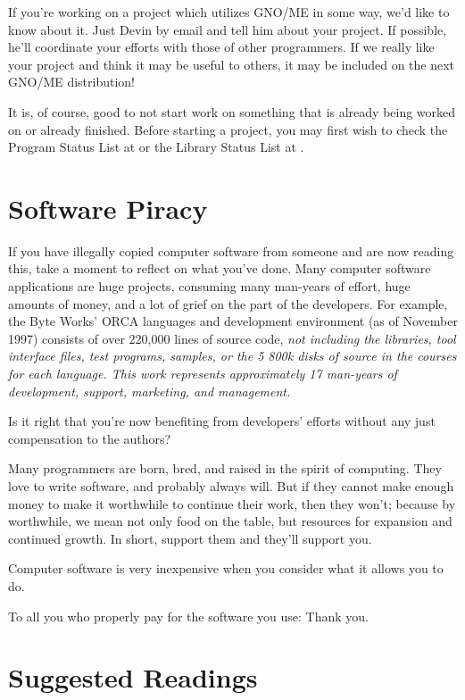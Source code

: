 \documentclass{report}
\begin{document}
If you're working on a project which
utilizes GNO/ME in some way, we'd like to know about it. Just
Devin by email and tell him about your project. If possible, he'll
coordinate your efforts with those of other programmers. If we
really like your project and think it may be useful to others, it
may be included on the next GNO/ME distribution!

It is, of course, good to not start work on something that is already
being worked on or already finished.  Before starting a project, you may
first wish to check the Program Status List at
or the Library Status List at
.

\section{Software Piracy}

If you have illegally copied computer software from someone
and are now reading this, take a moment to reflect on what you've done.
Many computer software applications are huge projects, consuming
many man-years of effort, huge amounts of money, and a lot of grief on the
part of the developers.
For example, the Byte Works' ORCA languages and development 
environment (as of November 1997) consists of over 220,000 lines
of source code, \em not \rm including the libraries, tool 
interface files, test programs, samples, or the 5 800k disks
of source in the courses for each language.  This work represents
approximately 17 man-years of development, support, marketing,
and management.

Is it right that you're now benefiting from
developers' efforts without any just compensation to the authors?

Many programmers are born, bred, and raised in the spirit of
computing. They love to write software, and probably always
will. But if they cannot make enough money to make it
worthwhile to continue their work, then they won't; because by
worthwhile, we mean not only food on the table, but resources for
expansion and continued growth. In short,
support them and they'll support you.
 
Computer software is very inexpensive when you
consider what it allows you to do.
 
To all you who properly pay for the software you use:
Thank you.

\section{Suggested Readings}
\end{document}
